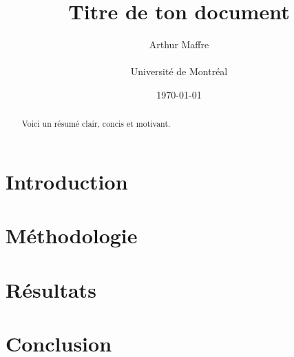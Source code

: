 \documentclass[11pt]{article}
\title{Titre de ton document}
\author{Arthur Maffre \\\\ Université de Montréal}
\date{\today}
\begin{document}
\maketitle

\begin{abstract}
Voici un résumé clair, concis et motivant.
\end{abstract}

\section{Introduction}


\section{Méthodologie}


\section{Résultats}


\section{Conclusion}




\end{document}
